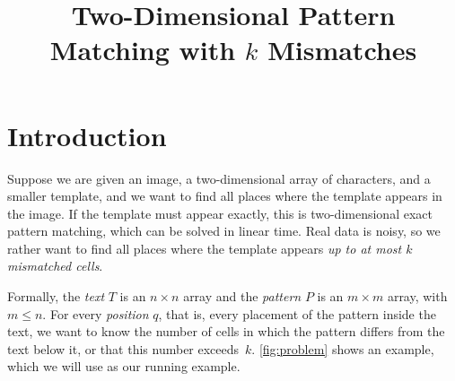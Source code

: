 \documentclass[11pt]{article}
\title{Two-Dimensional Pattern Matching with $k$ Mismatches}
\author{}
\date{}
\theoremstyle{definition}
\begin{document}
\maketitle

\section{Introduction}

Suppose we are given an image, a two-dimensional array of characters, and a smaller template, and we want to find all places where the template appears in the image.
If the template must appear exactly, this is two-dimensional exact pattern matching, which can be solved in linear time.
Real data is noisy, so we rather want to find all places where the template appears \emph{up to at most $k$ mismatched cells}.

Formally, the \emph{text} $T$ is an $n \times n$ array and the \emph{pattern} $P$ is an $m \times m$ array, with $m \le n$.
For every \emph{position} $q$, that is, every placement of the pattern inside the text, we want to know the number of cells in which the pattern differs from the text below it, or that this number exceeds~$k$.
\autoref{fig:problem} shows an example, which we will use as our running example.
\end{document}
